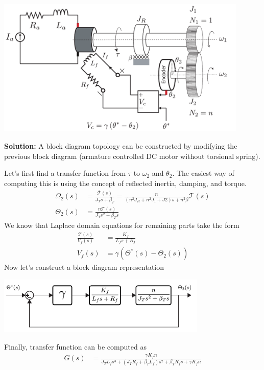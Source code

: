 \documentclass[twoside]{article}
\begin{document}
  
    \begin{minipage}[h]{1\linewidth}
    \begin{center}
      \includegraphics[width=0.9\textwidth]{DC_Mot_ex2}
    \end{center}
  \end{minipage} 
  
    \textbf{Solution:} A block diagram topology can be constructed by modifying the previous block diagram (armature controlled DC motor without torsional spring).
    
    Let's first find a transfer function from $\tau$ to $\omega_2$ and $\theta_2$. The easiest way of computing this is using the concept of reflected inertia, damping, and torque. 
    \begin{align*}
            \Omega_2(s) &= \frac{\bar{\mathcal{T}}(s)}{J_T s + \beta_T } = \frac{n}{\left( n^2 J_R + n^2 J_1 + J2 \right) s + n^2 \beta } 	\mathcal{T}(s) 
            \\
            \Theta_2(s) &= \frac{n \mathcal{T}(s)}{J_T s^2 + \beta_T s} 
    \end{align*}
    We know that Laplace domain equations for remaining parts take the form
    \begin{align*}
    \frac{\mathcal{T}(s)}{V_f(s)} &= \frac{K_f}{L_f s + R_f}
    \\
    V_f(s) &= \gamma \left( \Theta^*(s) - \Theta_2(s) \right)
    \end{align*}
    Now let's construct a block diagram representation
    
        \begin{minipage}[h]{1\linewidth}
    \begin{center}
      \includegraphics[width=0.75\textwidth]{field_block}
    \end{center}
  \end{minipage} 
    
Finally, transfer function can be computed as
    \begin{align*}
            G(s) &= \frac{\gamma K_f n}{ J_T L_f s^3 +  (J_T R_f + \beta_T L_f) s^2 + \beta_T R_f s + \gamma K_f n}
\end{align*}
    
\end{document}

